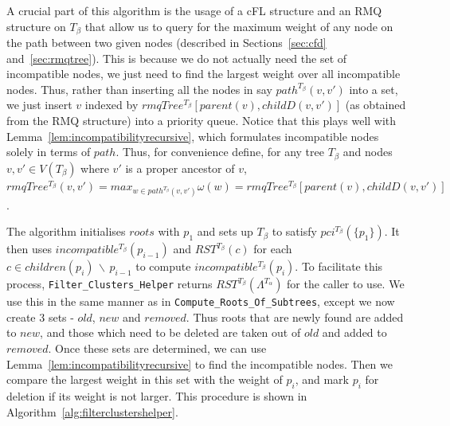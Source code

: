 \documentclass{article}
\newcommand{\leafset}{\Lambda}
\newcommand{\weight}{\omega}
\newcommand{\TA}{T_\alpha}
\newcommand{\TB}{T_\beta}
\begin{document}
    A crucial part of this algorithm is the usage of a cFL structure and an RMQ structure on $\TB$ that allow us to query for the maximum weight of any node on the path between two given nodes (described in Sections~\ref{sec:cfd} and~\ref{sec:rmqtree}). This is because we do not actually need the set of incompatible nodes, we just need to find the largest weight over all incompatible nodes. Thus, rather than inserting all the nodes in say $path^{\TB}(v, v')$ into a set, we just insert $v$ indexed by $rmqTree^{\TB}[parent(v), childD(v, v')]$ (as obtained from the RMQ structure) into a priority queue. Notice that this plays well with Lemma~\ref{lem:incompatibilityrecursive}, which formulates incompatible nodes solely in terms of $path$. Thus, for convenience define, for any tree $\TB$ and nodes $v, v' \in V(\TB)$ where $v'$ is a proper ancestor of $v$, $rmqTree^{\TB}(v, v') = max_{w \in path^{\TB}(v, v')} \weight(w) = rmqTree^{\TB}[parent(v), childD(v, v')]$.

    The algorithm initialises $roots$ with $p_1$ and sets up $\TB$ to satisfy $pci^{\TB}(\{p_1\})$. It then uses $incompatible^{\TB}(p_{i-1})$ and $RST^{\TB}(c)$ for each $c \in children(p_i)\, \backslash\, p_{i-1}$ to compute $incompatible^{\TB}(p_i)$. To facilitate this process, \texttt{Filter\_Clusters\_Helper} returns $RST^{\TB}(\leafset^{\TA})$ for the caller to use. We use this in the same manner as in \texttt{Compute\_Roots\_Of\_Subtrees}, except we now create 3 sets - $old$, $new$ and $removed$. Thus roots that are newly found are added to $new$, and those which need to be deleted are taken out of $old$ and added to $removed$. Once these sets are determined, we can use Lemma~\ref{lem:incompatibilityrecursive} to find the incompatible nodes. Then we compare the largest weight in this set with the weight of $p_i$, and mark $p_i$ for deletion if its weight is not larger. This procedure is shown in Algorithm~\ref{alg:filterclustershelper}.
\end{document}
